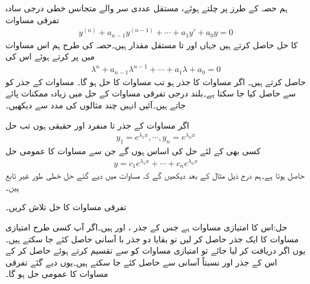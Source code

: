 ہم حصہ  کے طرز پر چلتے ہوئے، مستقل عددی سر والے متجانس خطی  درجی  سادہ تفرقی مساوات
\begin{align}\label{مساوات_سادہ_بلند_مستقل_سر_متجانس_الف}
y^{(n)}+a_{n-1}y^{(n-1)}+\cdots+a_1y'+a_0y=0
\end{align}
کا حل حاصل کرتے ہیں جہاں  اور  تا  مستقل مقدار ہیں۔حصہ  کی طرح ہم اس مساوات میں  پر کرتے ہوئے اس کی  
\begin{align}\label{مساوات_سادہ_بلند_مستقل_سر_متجانس_ب}
\lambda^n+a_{n-1}\lambda^{n-1}+\cdots+a_1 \lambda+a_0=0
\end{align}
حاصل کرتے ہیں۔ اگر  مساوات  کا جذر ہو تب  مساوات  کا حل ہو گا۔ مساوات  کے جذر کو  سے حاصل کیا جا سکتا ہے۔بلند درجی  تفرقی مساوات کے حل میں زیادہ ممکنات پائے جاتے ہیں۔آئیں انہیں چند مثالوں کی مدد سے دیکھیں۔

اگر مساوات  کے  جذر  تا  منفرد اور حقیقی ہوں  تب حل
\begin{align}\label{مساوات_سادہ_بلند_مستقل_سر_متجانس_پ}
y_1=e^{\lambda_1 x}, \cdots , y_n=e^{\lambda_n x}
\end{align}
کسی بھی  کے لئے حل کی اساس ہوں گے جن سے مساوات  کا عمومی حل
\begin{align}\label{مساوات_سادہ_بلند_مستقل_سر_متجانس_ت}
y=c_1 e^{\lambda_1 x}+\cdots+c_n e^{\lambda_n x}
\end{align}
حاصل ہوتا ہے۔ہم درج ذیل مثال کے بعد دیکھیں گے کہ مساوات  میں دیے گئے حل خطی طور غیر تابع ہیں۔

تفرقی مساوات  کا حل تلاش کریں۔

حل:اس کا امتیازی مساوات  ہے جس کے جذر ،  اور  ہیں۔اگر آپ کسی طرح امتیازی مساوات کا ایک جذر حاصل کر لیں تو بقایا دو جذر با آسانی حاصل کئے جا سکتے ہیں۔یوں اگر  دریافت کر لیا جائے تو امتیازی مساوات کو  سے تقسیم کرتے ہوئے   حاصل کر کے اس کے جذر  اور  نسبتاً آسانی سے حاصل کئے جا سکتے ہیں۔یوں دیے گئے تفرقی مساوات کا  عمومی حل  ہو گا۔

